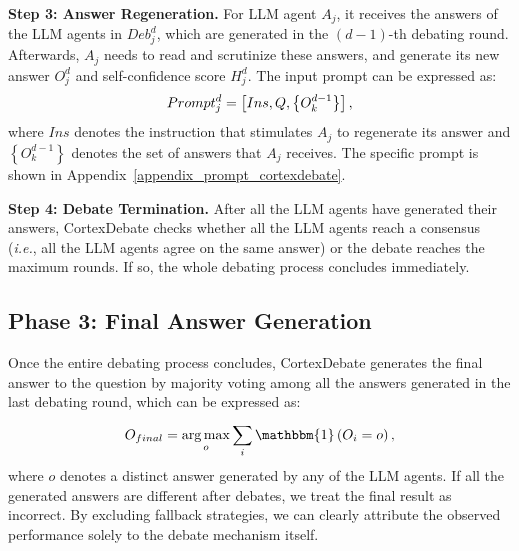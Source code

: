 \textbf{Step 3: Answer Regeneration.} For LLM agent $A_{j}$, it receives the answers of the LLM agents in $Deb_{j}^{d}$, which are generated in the $(d-1)$-th debating round. Afterwards, $A_{j}$ needs to read and scrutinize these answers, and generate its new answer $O_{j}^{d}$ and self-confidence score $H_{j}^{d}$. The input prompt can be expressed as:
\begin{equation}
\setlength{\abovedisplayskip}{1mm}
\setlength{\belowdisplayskip}{1mm}
\label{13}
  Prompt_{j}^{d} = \left [ Ins,Q,\left \{ O_{k}^{d-1} \right \}  \right ],
\end{equation}
\noindent where $Ins$ denotes the instruction that stimulates $A_{j}$ to regenerate its answer and $\left \{ O_{k}^{d-1} \right \}$ denotes the set of answers that $A_{j}$ receives. The specific prompt is shown in Appendix~\ref{appendix_prompt_cortexdebate}.

\textbf{Step 4: Debate Termination.} After all the LLM agents have generated their answers, CortexDebate checks whether all the LLM agents reach a consensus (\textit{i.e.}, all the LLM agents agree on the same answer) or the debate reaches the maximum rounds. If so, the whole debating process concludes immediately.

\subsection{Phase 3: Final Answer Generation}

Once the entire debating process concludes, CortexDebate generates the final answer to the question by majority voting among all the answers generated in the last debating round, which can be expressed as:
\begin{equation}
\setlength{\abovedisplayskip}{1mm}
\setlength{\belowdisplayskip}{1mm}
  \label{14}
  O_{final} =   \mathop{\arg\max }\limits_{o} \sum_{i}^{} \mathbbm{1} \left ( O_{i} = o \right ),
\end{equation}
\noindent where $o$ denotes a distinct answer generated by any of the LLM agents. If all the generated answers are different after debates, we treat the final result as incorrect. By excluding fallback strategies, we can clearly attribute the observed performance solely to the debate mechanism itself.